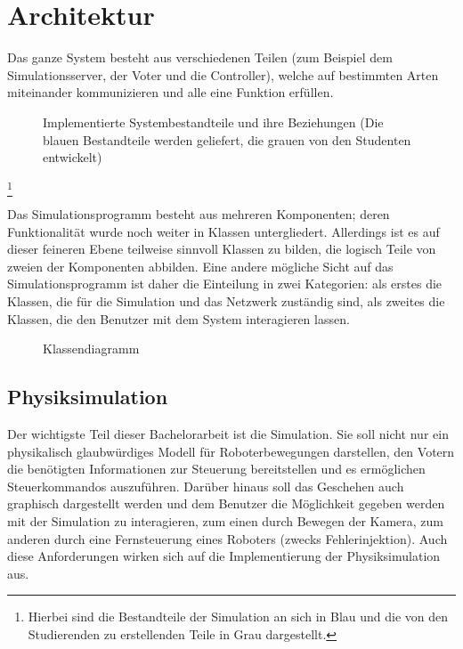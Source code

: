 \section{Architektur}
Das ganze System besteht aus verschiedenen Teilen (zum Beispiel dem Simulationsserver, der Voter und die Controller), welche
auf bestimmten Arten miteinander kommunizieren und alle eine Funktion erf{\"{u}}llen.

\begin{figure}
	\centering
	\caption[Implementierte Systembestandteile]{Implementierte Systembestandteile und ihre Beziehungen (Die blauen Bestandteile werden geliefert, die grauen von den Studenten entwickelt)}
	\label{fig:arch}
\end{figure}
\footnote{Hierbei sind die Bestandteile der Simulation an sich in Blau und die von den Studierenden zu erstellenden Teile in Grau
dargestellt.}


Das Simulationsprogramm besteht aus mehreren Komponenten; deren Funktionalit{\"{a}}t wurde noch weiter in Klassen untergliedert. Allerdings
ist es auf dieser feineren Ebene teilweise sinnvoll Klassen zu bilden, die logisch Teile von zweien der Komponenten abbilden. Eine andere
m{\"{o}}gliche Sicht auf das Simulationsprogramm ist daher die Einteilung in zwei Kategorien: als erstes die Klassen, die f{\"{u}}r die
Simulation und das Netzwerk zust{\"{a}}ndig sind, als zweites die Klassen, die den Benutzer mit dem System interagieren lassen.
\begin{figure}
	\centering
	\caption{Klassendiagramm}
	\label{fig:uml}
\end{figure}

\subsection{Physiksimulation}
Der wichtigste Teil dieser Bachelorarbeit ist die Simulation. Sie soll nicht nur ein physikalisch glaubw{\"{u}}rdiges Modell
f{\"{u}}r Roboterbewegungen darstellen, den Votern die ben{\"{o}}tigten Informationen zur Steuerung bereitstellen und
es erm{\"{o}}glichen Steuerkommandos auszuf{\"{u}}hren. Dar{\"{u}}ber hinaus soll das Geschehen auch graphisch
dargestellt werden und dem Benutzer die M{\"{o}}glichkeit gegeben werden mit der Simulation zu interagieren, zum einen
durch Bewegen der Kamera, zum anderen durch eine Fernsteuerung eines Roboters (zwecks Fehlerinjektion). Auch diese
Anforderungen wirken sich auf die Implementierung der Physiksimulation aus. 

